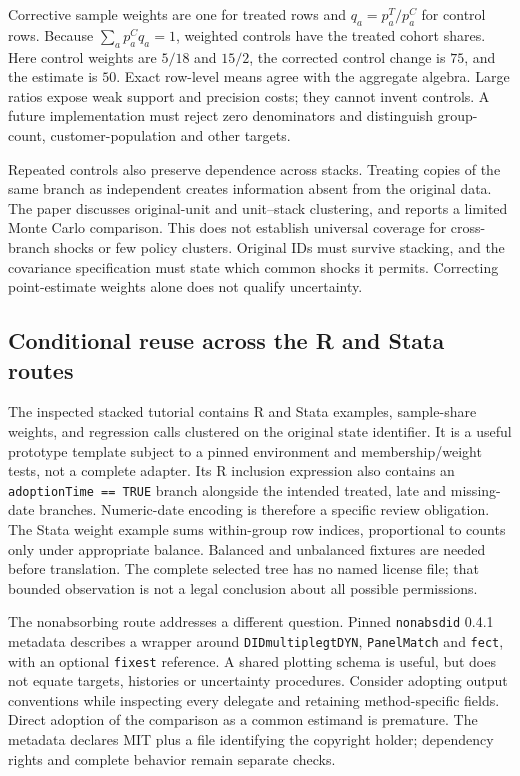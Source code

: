 Corrective sample weights are one for treated rows and $q_a=p_a^T/p_a^C$ for control rows. Because
$\sum_a p_a^Cq_a=1$, weighted controls have the treated cohort shares. Here control weights are $5/18$ and $15/2$,
the corrected control change is $75$, and the estimate is $50$. Exact row-level means agree with the aggregate algebra.
Large ratios expose weak support and precision costs; they cannot invent controls. A future implementation must reject
zero denominators and distinguish group-count, customer-population and other targets.\citep{exec28_panel_wing,exec28_panel_reference}

Repeated controls also preserve dependence across stacks. Treating copies of the same branch as independent creates
information absent from the original data. The paper discusses original-unit and unit--stack clustering, and reports a
limited Monte Carlo comparison. This does not establish universal coverage for cross-branch shocks or few policy clusters.
Original IDs must survive stacking, and the covariance specification must state which common shocks it permits.
Correcting point-estimate weights alone does not qualify uncertainty.\citep{exec28_panel_wing}

\subsection{Conditional reuse across the R and Stata routes}

The inspected stacked tutorial contains R and Stata examples, sample-share weights, and regression calls clustered on
the original state identifier. It is a useful prototype template subject to a pinned environment and membership/weight
tests, not a complete adapter. Its R inclusion expression also contains an \texttt{adoptionTime == TRUE} branch alongside
the intended treated, late and missing-date branches. Numeric-date encoding is therefore a specific review obligation.
The Stata weight example sums within-group row indices, proportional to counts only under appropriate balance.
Balanced and unbalanced fixtures are needed before translation. The complete selected tree has no named license file;
that bounded observation is not a legal conclusion about all possible permissions.\citep{exec28_panel_software}

The nonabsorbing route addresses a different question. Pinned \texttt{nonabsdid} 0.4.1 metadata describes a wrapper around
\texttt{DIDmultiplegtDYN}, \texttt{PanelMatch} and \texttt{fect}, with an optional \texttt{fixest} reference.
A shared plotting schema is useful, but does not equate targets, histories or uncertainty procedures. Consider adopting
output conventions while inspecting every delegate and retaining method-specific fields. Direct adoption of the comparison
as a common estimand is premature. The metadata declares MIT plus a file identifying the copyright holder; dependency
rights and complete behavior remain separate checks.\citep{exec28_panel_software}

